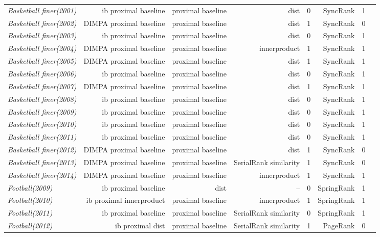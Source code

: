 \documentclass[nohyperref]{article}
\theoremstyle{plain}
\theoremstyle{definition}
\theoremstyle{remark}
\begin{document}
\begin{table*}[!ht]
{\begin{tabular}{lrrrrrrr}
			{\it Basketball finer(2001)} & ib proximal baseline & proximal baseline & dist & 0 & SyncRank & 1 \\
			{\it Basketball finer(2002)} & DIMPA proximal baseline & proximal baseline & dist & 1 & SyncRank & 0 \\
			{\it Basketball finer(2003)} & ib proximal baseline & proximal baseline & dist & 0 & SyncRank & 1 \\
			{\it Basketball finer(2004)} & DIMPA proximal baseline & proximal baseline & innerproduct & 1 & SyncRank & 1 \\
			{\it Basketball finer(2005)} & DIMPA proximal baseline & proximal baseline & dist & 1 & SyncRank & 1 \\
			{\it Basketball finer(2006)} & ib proximal baseline & proximal baseline & dist & 0 & SyncRank & 1 \\
			{\it Basketball finer(2007)} & DIMPA proximal baseline & proximal baseline & dist & 1 & SyncRank & 1 \\
			{\it Basketball finer(2008)} & ib proximal baseline & proximal baseline & dist & 0 & SyncRank & 1 \\
			{\it Basketball finer(2009)} & ib proximal baseline & proximal baseline & dist & 0 & SyncRank & 1 \\
			{\it Basketball finer(2010)} & ib proximal baseline & proximal baseline & dist & 0 & SyncRank & 1 \\
			{\it Basketball finer(2011)} & ib proximal baseline & proximal baseline & dist & 0 & SyncRank & 1 \\
			{\it Basketball finer(2012)} & DIMPA proximal baseline & proximal baseline & dist & 1 & SyncRank & 0 \\
			{\it Basketball finer(2013)} & DIMPA proximal baseline & proximal baseline & SerialRank similarity & 1 & SyncRank & 0 \\
			{\it Basketball finer(2014)} & DIMPA proximal baseline & proximal baseline & innerproduct & 1 & SyncRank & 1 \\
			{\it Football(2009)} & ib proximal baseline & dist & -- & 0 & SpringRank & 1 \\
			{\it Football(2010)} & ib proximal innerproduct & proximal baseline & innerproduct & 1 & SpringRank & 1 \\
			{\it Football(2011)} & ib proximal baseline & proximal baseline & SerialRank similarity & 0 & SpringRank & 1 \\
			{\it Football(2012)} & ib proximal dist & proximal baseline & SerialRank similarity & 1 & PageRank & 0 \\

\end{tabular}}
\end{table*}
\end{document}

